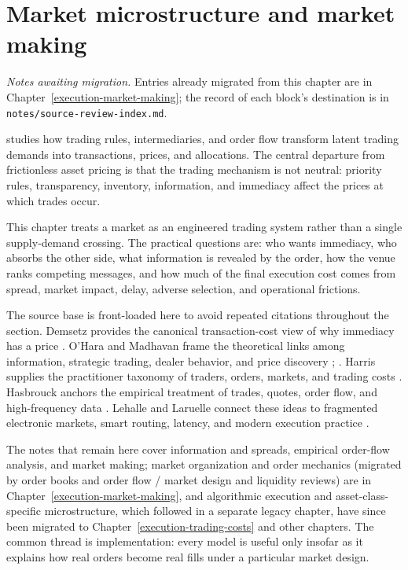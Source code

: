 \chapter{Market microstructure and market making}\label{legacy:execution-market-making}

\noindent\emph{Notes awaiting migration.} Entries already migrated from this chapter are in Chapter~\ref{execution-market-making}; the record of each block's destination is in \texttt{notes/source-review-index.md}.

 studies how trading rules, intermediaries, and order flow transform latent trading demands into transactions, prices, and allocations. The central departure from frictionless asset pricing is that the trading mechanism is not neutral: priority rules, transparency, inventory, information, and immediacy affect the prices at which trades occur.

This chapter treats a market as an engineered trading system rather than a single supply-demand crossing. The practical questions are: who wants immediacy, who absorbs the other side, what information is revealed by the order, how the venue ranks competing messages, and how much of the final execution cost comes from spread, market impact, delay, adverse selection, and operational frictions.

The source base is front-loaded here to avoid repeated citations throughout the section. Demsetz provides the canonical transaction-cost view of why immediacy has a price \citep{demsetz-1968}. O'Hara and Madhavan frame the theoretical links among information, strategic trading, dealer behavior, and price discovery \citep{catalogue-0496}; \citep{madhavan-2000}. Harris supplies the practitioner taxonomy of traders, orders, markets, and trading costs \citep{alpha-harris}. Hasbrouck anchors the empirical treatment of trades, quotes, order flow, and high-frequency data \citep{s6-hasbrouck}. Lehalle and Laruelle connect these ideas to fragmented electronic markets, smart routing, latency, and modern execution practice \citep{alpha-laruelle}.

The notes that remain here cover information and spreads, empirical order-flow analysis, and market making; market organization and order mechanics (migrated by order books and order flow / market design and liquidity reviews) are in Chapter~\ref{execution-market-making}, and algorithmic execution and asset-class-specific microstructure, which followed in a separate legacy chapter, have since been migrated to Chapter~\ref{execution-trading-costs} and other chapters. The common thread is implementation: every model is useful only insofar as it explains how real orders become real fills under a particular market design.



\newpage


\newpage

